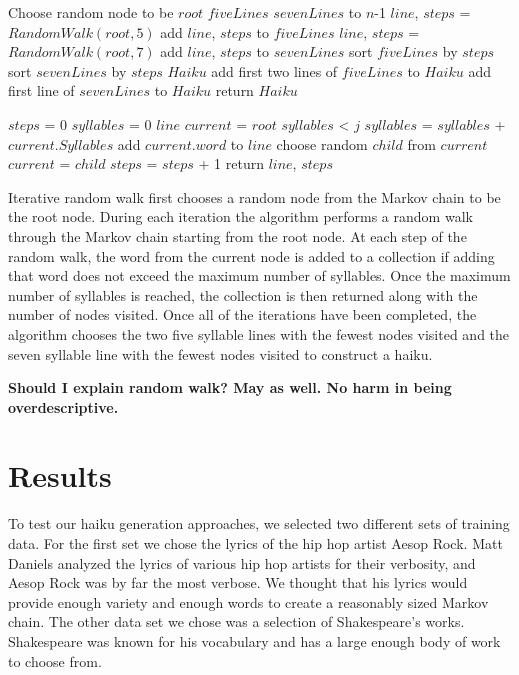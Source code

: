\documentclass[]{article}
\newcommand{\comment}[1]
{\par {\bfseries \color{green} #1 \par}}
\begin{document}
\begin{algorithm}[H]
	\caption{$IterativeRandomWalk(n)$} \label{IterativeRandomWalk}
	\begin{algorithmic}[1]
		\State Choose random node to be $root$
		\State $fiveLines$
		\State $sevenLines$
		 to $n$-1
			\State $line$, $steps$ = $RandomWalk(root, 5)$
			\State add $line$, $steps$ to $fiveLines$
			\State $line$, $steps$ = $RandomWalk(root, 7)$
			\State add $line$, $steps$ to $sevenLines$ 
		\EndFor
		\State sort $fiveLines$ by $steps$
		\State sort $sevenLines$ by $steps$
		\State $Haiku$
		\State add first two lines of $fiveLines$ to $Haiku$
		\State add first line of $sevenLines$ to $Haiku$
		\State return $Haiku$
	\end{algorithmic}
\end{algorithm}

\begin{algorithm}[H]
	\caption{$RandomWalk(root, j)$} \label{RandomWalk}
	\begin{algorithmic}[1]
		\State $steps$ = 0
		\State $syllables$ = 0
		\State $line$
		\State $current$ = $root$
		\While $syllables$ < $j$
				$syllables$ = $syllables$ + $current.Syllables$
				\State add $current.word$ to $line$
			\EndIf
			\State choose random $child$ from $current$
			$current$ = $child$
			$steps$ = $steps$ + 1
		\EndWhile
		\State return $line$, $steps$
	\end{algorithmic}
\end{algorithm}

Iterative random walk first chooses a random node from the Markov chain to be the root node. During each iteration the algorithm performs a random walk through the Markov chain starting from the root node. At each step of the random walk, the word from the current node is added to a collection if adding that word does not exceed the maximum number of syllables. Once the maximum number of syllables is reached, the collection is then returned along with the number of nodes visited. Once all of the iterations have been completed, the algorithm chooses the two five syllable lines with the fewest nodes visited and the seven syllable line with the fewest nodes visited to construct a haiku. 

\comment{Should I explain random walk? May as well. No harm in being overdescriptive.}

\section{Results}
To test our haiku generation approaches, we selected two different sets of training data. For the first set we chose the lyrics of the hip hop artist Aesop Rock. Matt Daniels analyzed the lyrics of various hip hop artists for their verbosity, and Aesop Rock was by far the most verbose\cite{Vocab}. We thought that his lyrics would provide enough variety and enough words to create a reasonably sized Markov chain. The other data set we chose was a selection of Shakespeare's works. Shakespeare was known for his vocabulary and has a large enough body of work to choose from.
\end{document}
